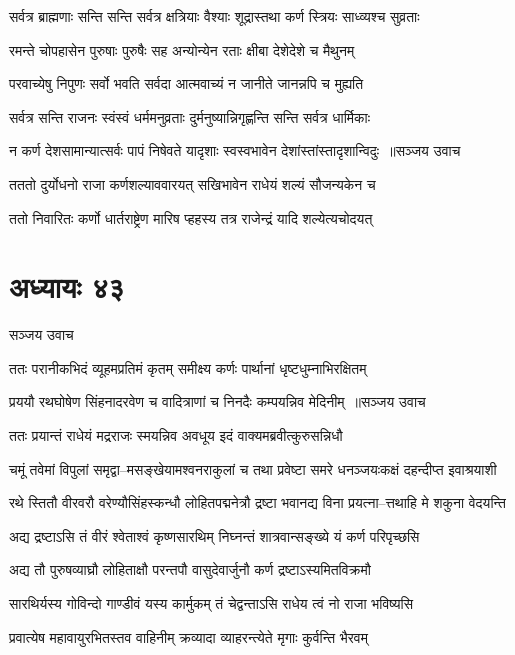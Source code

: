 \twolineshloka
{सर्वत्र ब्राह्मणाः सन्ति सन्ति सर्वत्र क्षत्रियाः}
{वैश्याः शूद्रास्तथा कर्ण स्त्रियः साध्व्यश्च सुव्रताः}


\twolineshloka
{रमन्ते चोपहासेन पुरुषाः पुरुषैः सह}
{अन्योन्येन रताः क्षीबा देशेदेशे च मैथुनम्}


\twolineshloka
{परवाच्येषु निपुणः सर्वो भवति सर्वदा}
{आत्मवाच्यं न जानीते जानन्नपि च मुह्यति}


\twolineshloka
{सर्वत्र सन्ति राजनः स्वंस्वं धर्ममनुव्रताः}
{दुर्मनुष्यान्निगृह्णन्ति सन्ति सर्वत्र धार्मिकाः}


\threelineshloka
{न कर्ण देशसामान्यात्सर्वः पापं निषेवते}
{यादृशाः स्वस्वभावेन देशांस्तांस्तादृशान्विदुः ॥सञ्जय उवाच}
{}


\twolineshloka
{तततो दुर्योधनो राजा कर्णशल्याववारयत्}
{सखिभावेन राधेयं शल्यं सौजन्यकेन च}


\twolineshloka
{ततो निवारितः कर्णो धार्तराष्ट्रेण मारिष}
{प्हहस्य तत्र राजेन्द्रं यादि शल्येत्यचोदयत्}


\chapter{अध्यायः ४३}
\twolineshloka
{सञ्जय उवाच}
{}


\twolineshloka
{ततः परानीकभिदं व्यूहमप्रतिमं कृतम्}
{समीक्ष्य कर्णः पार्थानां धृष्टधुम्नाभिरक्षितम्}


\threelineshloka
{प्रययौ रथघोषेण सिंहनादरवेण च}
{वादित्राणां च निनदैः कम्पयन्निव मेदिनीम् ॥सञ्जय उवाच}
{}


\twolineshloka
{ततः प्रयान्तं राधेयं मद्रराजः स्मयन्निव}
{अवधूय इदं वाक्यमब्रवीत्कुरुसन्निधौ}


\twolineshloka
{चमूं तवेमां विपुलां समृद्वा--मसङ्खेयामश्वनराकुलां च}
{तथा प्रवेष्टा समरे धनञ्जयःकक्षं दहन्दीप्त इवाश्रयाशी}


\twolineshloka
{रथे स्तितौ वीरवरौ वरेण्यौसिंहस्कन्धौ लोहितपद्मनेत्रौ}
{द्रष्टा भवानद्य विना प्रयत्ना--त्तथाहि मे शकुना वेदयन्ति}


\twolineshloka
{अद्य द्रष्टाऽसि तं वीरं श्वेताश्वं कृष्णसारथिम्}
{निघ्नन्तं शात्रवान्सङ्ख्ये यं कर्ण परिपृच्छसि}


\twolineshloka
{अद्य तौ पुरुषव्याघ्रौ लोहिताक्षौ परन्तपौ}
{वासुदेवार्जुनौ कर्ण द्रष्टाऽस्यमितविक्रमौ}


\twolineshloka
{सारथिर्यस्य गोविन्दो गाण्डीवं यस्य कार्मुकम्}
{तं चेद्वन्ताऽसि राधेय त्वं नो राजा भविष्यसि}


\twolineshloka
{प्रवात्येष महावायुरभितस्तव वाहिनीम्}
{क्रव्यादा व्याहरन्त्येते मृगाः कुर्वन्ति भैरवम्}


